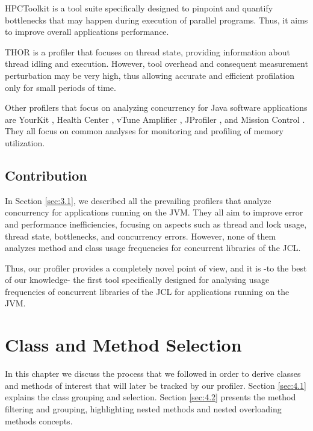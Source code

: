 \documentclass[]{usiinfthesis}
\begin{document}
HPCToolkit \cite{HPCToolkit} is a tool suite specifically designed to pinpoint and quantify bottlenecks that may happen during execution of parallel programs. Thus, it aims to improve overall applications performance.

THOR \cite{THOR} is a profiler that focuses on thread state, providing information about thread idling and execution. However, tool overhead and consequent measurement perturbation may be very high, thus allowing accurate and efficient profilation only for small periods of time.

Other profilers that focus on analyzing concurrency for Java software applications are YourKit \cite{YourKit}, Health Center \cite{Health Center}, vTune Amplifier \cite{vTune Amplifier}, JProfiler \cite{JProfiler}, and Mission Control \cite{Mission Control}. They all focus on common analyses for monitoring and profiling of memory utilization.


\section{Contribution}  \label{sec:3.2}
In Section \ref{sec:3.1}, we described all the prevailing profilers that analyze concurrency for applications running on the JVM. They all aim to improve error and performance inefficiencies, focusing on aspects such as thread and lock usage, thread state, bottlenecks, and concurrency errors. However, none of them analyzes method and class usage frequencies for concurrent libraries of the JCL.

Thus, our profiler provides a completely novel point of view, and it is -to the best of our knowledge- the first tool specifically designed for analysing usage frequencies of concurrent libraries of the JCL for applications running on the JVM.




\chapter{Class and Method Selection} \label{chap:4}
In this chapter we discuss the process that we followed in order to derive classes and methods of interest that will later be tracked by our profiler. Section \ref{sec:4.1} explains the class grouping and selection. Section \ref{sec:4.2} presents the method filtering and grouping, highlighting nested methods and nested overloading methods concepts.
\end{document}
